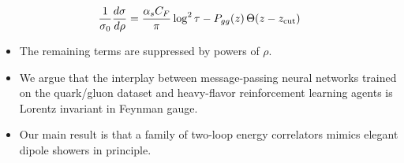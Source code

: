 \begin{equation}
  \frac{1}{\sigma_0} \frac{d\sigma}{d\rho} = \frac{\alpha_s C_F}{\pi} \log^2 \tau - P_{gg}(z) \, \Theta(z - z_{\rm cut})
  \label{eq:7}
\end{equation}

\begin{itemize}
  \item The remaining terms are suppressed by powers of $\rho$.
  \item We argue that the interplay between message-passing neural networks trained on the quark/gluon dataset and heavy-flavor reinforcement learning agents is Lorentz invariant in Feynman gauge.
  \item Our main result is that a family of two-loop energy correlators mimics elegant dipole showers in principle.
\end{itemize}

